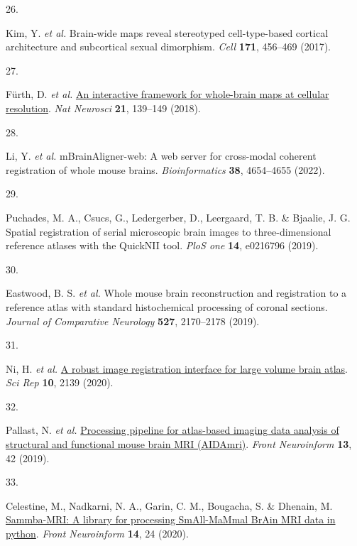 \documentclass[
  12pt,
]{article}
\newlength{\cslhangindent}
\newlength{\csllabelwidth}
\newenvironment{CSLReferences}[2] %
 {\begin{list}{}{%
  \setlength{\itemindent}{0pt}
  \setlength{\leftmargin}{0pt}
  \setlength{\parsep}{0pt}
  \ifodd #1
   \setlength{\leftmargin}{\cslhangindent}
   \setlength{\itemindent}{-1\cslhangindent}
  \fi
  \setlength{\itemsep}{#2\baselineskip}}}
 {\end{list}}
\newcommand{\CSLLeftMargin}[1]{\parbox[t]{\csllabelwidth}{\strut#1\strut}}
\newcommand{\CSLRightInline}[1]{\parbox[t]{\linewidth - \csllabelwidth}{\strut#1\strut}}
\begin{document}
\begin{CSLReferences}{0}{0}
\CSLLeftMargin{26. }%
\CSLRightInline{Kim, Y. \emph{et al.} Brain-wide maps reveal stereotyped
cell-type-based cortical architecture and subcortical sexual dimorphism.
\emph{Cell} \textbf{171}, 456--469 (2017).}

\CSLLeftMargin{27. }%
\CSLRightInline{Fürth, D. \emph{et al.}
\href{https://doi.org/10.1038/s41593-017-0027-7}{An interactive
framework for whole-brain maps at cellular resolution}. \emph{Nat
Neurosci} \textbf{21}, 139--149 (2018).}

\CSLLeftMargin{28. }%
\CSLRightInline{Li, Y. \emph{et al.} mBrainAligner-web: A web server for
cross-modal coherent registration of whole mouse brains.
\emph{Bioinformatics} \textbf{38}, 4654--4655 (2022).}

\CSLLeftMargin{29. }%
\CSLRightInline{Puchades, M. A., Csucs, G., Ledergerber, D., Leergaard,
T. B. \& Bjaalie, J. G. Spatial registration of serial microscopic brain
images to three-dimensional reference atlases with the QuickNII tool.
\emph{PloS one} \textbf{14}, e0216796 (2019).}

\CSLLeftMargin{30. }%
\CSLRightInline{Eastwood, B. S. \emph{et al.} Whole mouse brain
reconstruction and registration to a reference atlas with standard
histochemical processing of coronal sections. \emph{Journal of
Comparative Neurology} \textbf{527}, 2170--2178 (2019).}

\CSLLeftMargin{31. }%
\CSLRightInline{Ni, H. \emph{et al.}
\href{https://doi.org/10.1038/s41598-020-59042-y}{A robust image
registration interface for large volume brain atlas}. \emph{Sci Rep}
\textbf{10}, 2139 (2020).}

\CSLLeftMargin{32. }%
\CSLRightInline{Pallast, N. \emph{et al.}
\href{https://doi.org/10.3389/fninf.2019.00042}{Processing pipeline for
atlas-based imaging data analysis of structural and functional mouse
brain MRI (AIDAmri)}. \emph{Front Neuroinform} \textbf{13}, 42 (2019).}

\CSLLeftMargin{33. }%
\CSLRightInline{Celestine, M., Nadkarni, N. A., Garin, C. M., Bougacha,
S. \& Dhenain, M.
\href{https://doi.org/10.3389/fninf.2020.00024}{Sammba-MRI: A library
for processing SmAll-MaMmal BrAin MRI data in python}. \emph{Front
Neuroinform} \textbf{14}, 24 (2020).}


\end{CSLReferences}
\end{document}
